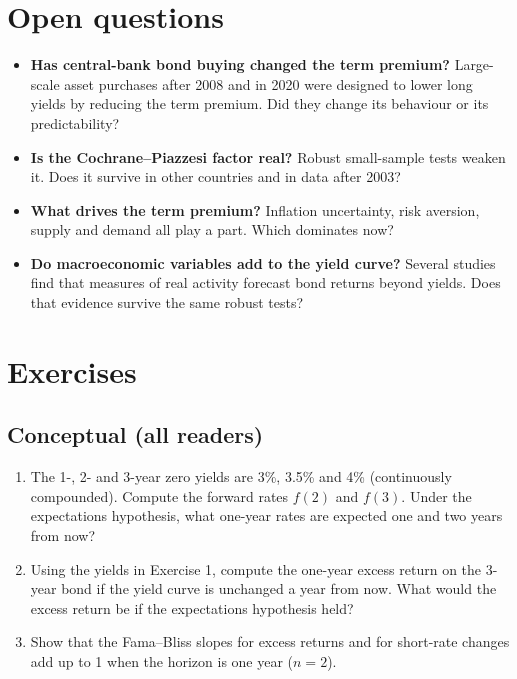 \section{Open questions}
\label{sec:16-open}

\begin{itemize}
  \item \textbf{Has central-bank bond buying changed the term premium?} Large-scale asset purchases after 2008 and in 2020 were designed to lower long yields by reducing the term premium. Did they change its behaviour or its predictability?
  \item \textbf{Is the Cochrane--Piazzesi factor real?} Robust small-sample tests weaken it. Does it survive in other countries and in data after 2003?
  \item \textbf{What drives the term premium?} Inflation uncertainty, risk aversion, supply and demand all play a part. Which dominates now?
  \item \textbf{Do macroeconomic variables add to the yield curve?} Several studies find that measures of real activity forecast bond returns beyond yields. Does that evidence survive the same robust tests?
\end{itemize}

\section*{Exercises}

\subsection*{Conceptual (all readers)}

\begin{enumerate}
  \item The 1-, 2- and 3-year zero yields are 3\%, 3.5\% and 4\% (continuously compounded). Compute the forward rates $f(2)$ and $f(3)$. Under the expectations hypothesis, what one-year rates are expected one and two years from now?
  \item Using the yields in Exercise 1, compute the one-year excess return on the 3-year bond if the yield curve is unchanged a year from now. What would the excess return be if the expectations hypothesis held?
  \item Show that the Fama--Bliss slopes for excess returns and for short-rate changes add up to 1 when the horizon is one year ($n = 2$).
\end{enumerate}


